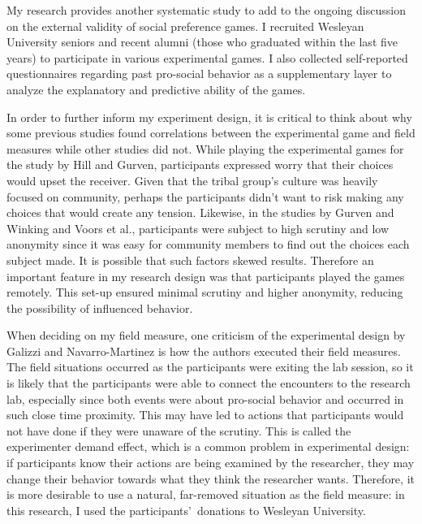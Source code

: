 \documentclass[12pt]{article}
\begin{document}
My research provides another systematic study to add to the ongoing discussion on the external validity of social preference games. I recruited Wesleyan University seniors and recent alumni (those who graduated within the last five years) to participate in various experimental games. I also collected self-reported questionnaires regarding past pro-social behavior as a supplementary layer to analyze the explanatory and predictive ability of the games.

In order to further inform my experiment design, it is critical to think about why some previous studies found correlations between the experimental game and field measures while other studies did not. While playing the experimental games for the study by Hill and Gurven, participants expressed worry that their choices would upset the receiver. Given that the tribal group\rq s culture was heavily focused on community, perhaps the participants didn\rq t want to risk making any choices that would create any tension. Likewise, in the studies by Gurven and Winking and Voors et al., participants were subject to high scrutiny and low anonymity since it was easy for community members to find out the choices each subject made. It is possible that such factors skewed results. Therefore an important feature in my research design was that participants played the games remotely. This set-up ensured minimal scrutiny and higher anonymity, reducing the possibility of influenced behavior.

When deciding on my field measure, one criticism of the experimental design by Galizzi and Navarro-Martinez is how the authors executed their field measures. The field situations occurred as the participants were exiting the lab session, so it is likely that the participants were able to connect the encounters to the research lab, especially since both events were about pro-social behavior and occurred in such close time proximity. This may have led to actions that participants would not have done if they were unaware of the scrutiny. This is called the experimenter demand effect, which is a common problem in experimental design: if participants know their actions are being examined by the researcher, they may change their behavior towards what they think the researcher wants. Therefore, it is more desirable to use a natural, far-removed situation as the field measure: in this research, I used the participants\rq \ donations to Wesleyan University.
\end{document}
